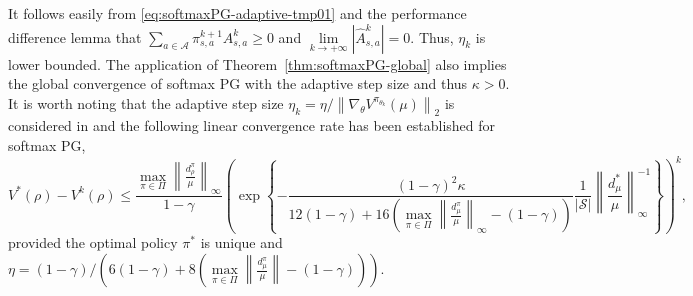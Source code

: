 \begin{remark} %
It follows easily from \eqref{eq:softmaxPG-adaptive-tmp01} and the performance difference lemma that $\sum_{a\in \mathcal{A}}{\pi _{s,a}^{k+1}A_{s,a}^{k}}\ge 0$ and $\underset{k\rightarrow +\infty}{\lim}| \hat{A}_{s,a}^{k} |=0$. Thus, $\eta_k$ is lower bounded. The application of Theorem~\ref{thm:softmaxPG-global} also implies the global convergence of softmax PG with the adaptive step size and  thus $\kappa>0$. 
It is worth noting that  the adaptive step size $
\eta _k={\eta}/{\left\| \nabla _{\theta}V^{\pi _{\theta _k}}\left( \mu \right) \right\| _2}$ is considered in  \textup{\cite{Mei_Xiao_Dai_Li_Szepesvari_Schuurmans_2020}} and the following linear convergence rate has been established for softmax PG,
$$
V^*\left( \rho \right) -V^{k}\left( \rho \right) \le \frac{\underset{\pi \in \Pi}{\max}\left\| \frac{d_{\rho}^{\pi}}{\mu} \right\| _{\infty}}{1-\gamma}\left( \exp \left\{ -\frac{\left( 1-\gamma \right) ^2\kappa}{12\left( 1-\gamma \right) +16\left( \underset{\pi \in \Pi}{\max}\left\| \frac{d_{\mu}^{\pi}}{\mu} \right\| _{\infty}-\left( 1-\gamma \right) \right)}\frac{1}{\left| \mathcal{S} \right|}\left\| \frac{d_{\mu}^{*}}{\mu} \right\| _{\infty}^{-1} \right\} \right) ^k,
$$
provided the optimal policy $\pi^*$ is unique and $
\eta =(1-\gamma)/\left({6\left( 1-\gamma \right) +8\left( \underset{\pi \in \Pi}{\max}\left\| \frac{d_{\mu}^{\pi}}{\mu} \right\| -\left( 1-\gamma \right) \right)}\right)$. 
\end{remark}